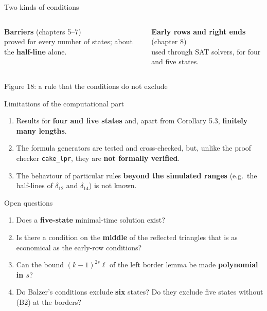 \begin{frame}{Two kinds of conditions}
\begin{columns}[T]
\begin{plainbox}\textbf{Barriers} (chapters 5--7)\\ proved for every number of states; about the \textbf{half-line} alone.\end{plainbox}
\begin{plainbox}\textbf{Early rows and right ends} (chapter 8)\\ used through SAT solvers, for four and five states.\end{plainbox}
\end{columns}
\end{frame}

\begin{frame}{Figure 18: a rule that the conditions do not exclude}
\centering\fig[0.64]{}\\[0.5ex]
\small
{}%
\end{frame}

\begin{frame}{Limitations of the computational part}
\begin{enumerate}
\item Results for \textbf{four and five states} and, apart from Corollary 5.3, \textbf{finitely many lengths}.
\item The formula generators are tested and cross-checked, but, unlike the proof checker \texttt{cake\_lpr}, they are \textbf{not formally verified}.
\item The behaviour of particular rules \textbf{beyond the simulated ranges} (e.g.\ the half-lines of $\delta_{12}$ and $\delta_{14}$) is not known.
\end{enumerate}
\end{frame}

\begin{frame}{Open questions}
\begin{enumerate}
\item Does a \textbf{five-state} minimal-time solution exist?
\item Is there a condition on the \textbf{middle} of the reflected triangles that is as economical as the early-row conditions?
\item Can the bound $(k-1)^{2s}\ell$ of the left border lemma be made \textbf{polynomial in $s$}?
\item Do Balzer's conditions exclude \textbf{six} states? Do they exclude five states without (B2) at the borders?
\end{enumerate}
\end{frame}

